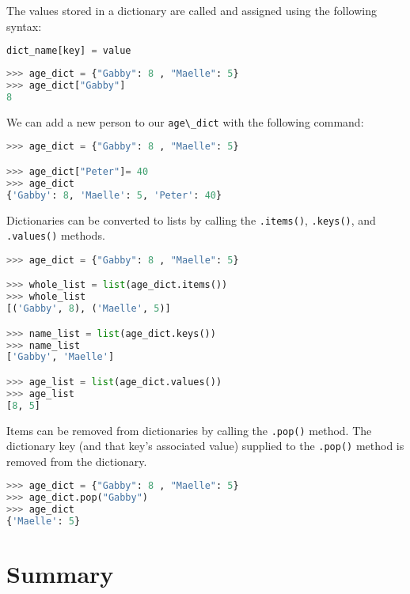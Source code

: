 \documentclass{book}
\newcommand{\passthrough}[1]{#1}
\begin{document}
The values stored in a dictionary are called and assigned using the
following syntax:

\begin{lstlisting}[language=Python]
dict_name[key] = value
\end{lstlisting}

\begin{lstlisting}[language=Python]
>>> age_dict = {"Gabby": 8 , "Maelle": 5}
>>> age_dict["Gabby"]
8
\end{lstlisting}

We can add a new person to our \passthrough{\lstinline!age\_dict!} with
the following command:

\begin{lstlisting}[language=Python]
>>> age_dict = {"Gabby": 8 , "Maelle": 5}

>>> age_dict["Peter"]= 40
>>> age_dict
{'Gabby': 8, 'Maelle': 5, 'Peter': 40}
\end{lstlisting}

Dictionaries can be converted to lists by calling the
\passthrough{\lstinline!.items()!}, \passthrough{\lstinline!.keys()!},
and \passthrough{\lstinline!.values()!} methods.

\begin{lstlisting}[language=Python]
>>> age_dict = {"Gabby": 8 , "Maelle": 5}

>>> whole_list = list(age_dict.items())
>>> whole_list
[('Gabby', 8), ('Maelle', 5)]

>>> name_list = list(age_dict.keys())
>>> name_list
['Gabby', 'Maelle']

>>> age_list = list(age_dict.values())
>>> age_list
[8, 5]
\end{lstlisting}

Items can be removed from dictionaries by calling the
\passthrough{\lstinline!.pop()!} method. The dictionary key (and that
key's associated value) supplied to the \passthrough{\lstinline!.pop()!}
method is removed from the dictionary.

\begin{lstlisting}[language=Python]
>>> age_dict = {"Gabby": 8 , "Maelle": 5}
>>> age_dict.pop("Gabby")
>>> age_dict
{'Maelle': 5}
\end{lstlisting}
    




    
        \newpage
        \hypertarget{summary}{%
\section{Summary}\label{summary}}
\end{document}
